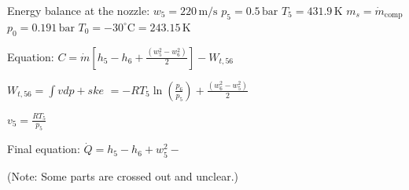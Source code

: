 Energy balance at the nozzle:  
\( w_5 = 220 \, \text{m/s} \)  
\( p_5 = 0.5 \, \text{bar} \)  
\( T_5 = 431.9 \, \text{K} \)  
\( m_s = \dot{m}_{\text{comp}} \)  
\( p_0 = 0.191 \, \text{bar} \)  
\( T_0 = -30^\circ \text{C} = 243.15 \, \text{K} \)  

Equation:  
\( C = \dot{m} \left[ h_5 - h_6 + \frac{(w_5^2 - w_6^2)}{2} \right] - W_{t,56} \)  

\( W_{t,56} = \int v dp + ske \)  
\( = -RT_5 \ln \left( \frac{p_6}{p_5} \right) + \frac{(w_6^2 - w_5^2)}{2} \)  

\( v_5 = \frac{RT_5}{p_5} \)  

Final equation:  
\( \dot{Q} = h_5 - h_6 + w_5^2 - \)  

(Note: Some parts are crossed out and unclear.)